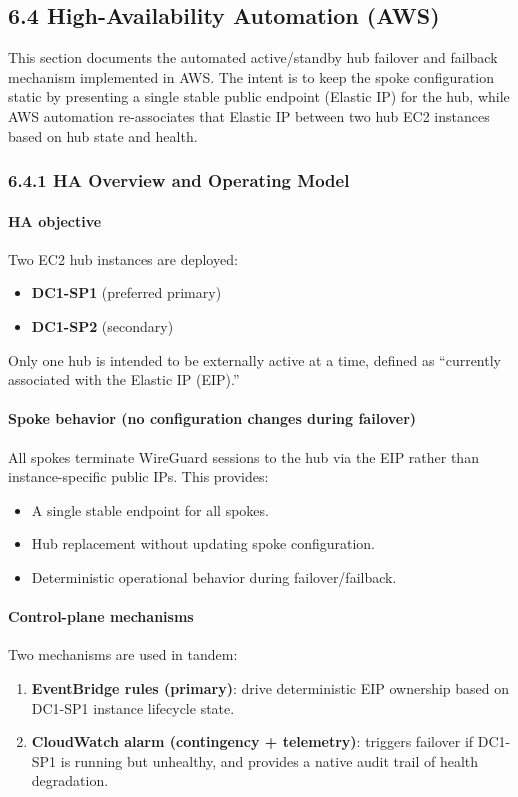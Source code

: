 \documentclass[11pt]{article}
\begin{document}
\subsection{6.4 High-Availability Automation (AWS)}
\label{sec:ha-automation-aws}

This section documents the automated active/standby hub failover and failback mechanism implemented in AWS. The intent is to keep the spoke configuration static by presenting a single stable public endpoint (Elastic IP) for the hub, while AWS automation re-associates that Elastic IP between two hub EC2 instances based on hub state and health.

\subsubsection{6.4.1 HA Overview and Operating Model}

\paragraph{HA objective}
Two EC2 hub instances are deployed:
\begin{itemize}
  \item \textbf{DC1-SP1} (preferred primary)
  \item \textbf{DC1-SP2} (secondary)
\end{itemize}
Only one hub is intended to be externally active at a time, defined as ``currently associated with the Elastic IP (EIP).''

\paragraph{Spoke behavior (no configuration changes during failover)}
All spokes terminate WireGuard sessions to the hub via the EIP rather than instance-specific public IPs. This provides:
\begin{itemize}
  \item A single stable endpoint for all spokes.
  \item Hub replacement without updating spoke configuration.
  \item Deterministic operational behavior during failover/failback.
\end{itemize}

\paragraph{Control-plane mechanisms}
Two mechanisms are used in tandem:
\begin{enumerate}
  \item \textbf{EventBridge rules (primary)}: drive deterministic EIP ownership based on DC1-SP1 instance lifecycle state.
  \item \textbf{CloudWatch alarm (contingency + telemetry)}: triggers failover if DC1-SP1 is running but unhealthy, and provides a native audit trail of health degradation.
\end{enumerate}
\end{document}
